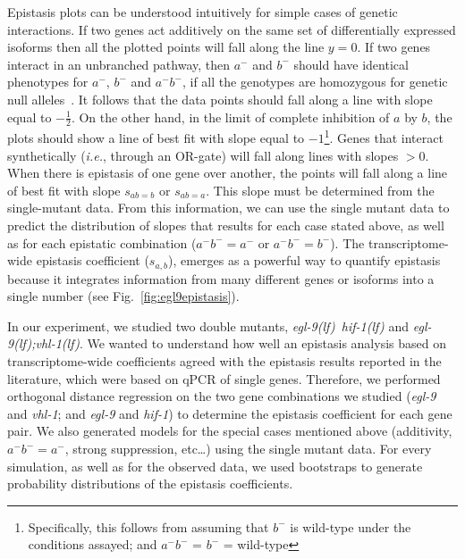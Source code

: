 \documentclass[9pt,twocolumn,twoside]{pnas-new}
\newcommand{\gene}[1]{\emph{#1}}
\newcommand{\eglvhl}{\emph{\mbox{egl-9(lf);vhl-1(lf)}}}
\newcommand{\eglhif}{\emph{\mbox{egl-9(lf)}~\mbox{hif-1(lf)}}}
\begin{document}
Epistasis plots can be understood intuitively for simple cases of genetic
interactions. If two genes act additively on the same set of differentially expressed
isoforms then all the plotted points will fall along the line $y=0$.
If two genes interact in an unbranched pathway, then $a^-$ and $b^-$ should
have identical phenotypes for $a^-$, $b^-$ and $a^-b^-$, if all the genotypes are
homozygous for genetic null alleles~\cite{Huang2006}. It follows that the
data points should fall along a line with slope equal to $-\frac{1}{2}$. On the
other hand, in the limit of complete inhibition of $a$ by $b$, the plots should show
a line of best fit with slope equal to $-1$\footnote{Specifically, this follows
from assuming that $b^-$ is wild-type under the conditions assayed; and
$a^-b^-$ = $b^-$ = wild-type}.
Genes that interact synthetically (\emph{i.e.}, through an OR-gate) will fall
along lines with slopes $>0$. When there is epistasis of one gene over another,
the points will fall along a line of best fit with slope $s_{ab=b}$ or $s_{ab=a}$.
This slope must be determined from the single-mutant data.
From this information, we can use the single mutant data to predict the
distribution of slopes that results for each case stated above, as well as for
each epistatic combination ($a^-b^-=a^-$ or $a^-b^-=b^-$). The transcriptome-wide
epistasis coefficient ($s_{a, b}$), emerges as a powerful way to quantify epistasis
because it integrates information from many different genes or isoforms into a
single number (see Fig.~\ref{fig:egl9epistasis}).

In our experiment, we studied two double mutants, \eglhif{} and \eglvhl{}.
We wanted to understand how well an epistasis analysis based on transcriptome-wide
coefficients agreed with the epistasis results reported in the literature, which
were based on qPCR of single genes. Therefore, we performed orthogonal distance
regression on the two gene combinations we studied (\gene{egl-9} and
\gene{vhl-1}; and \gene{egl-9} and \gene{hif-1}) to determine the epistasis
coefficient for each gene pair. We also generated models for the special cases
mentioned above (additivity, $a^-b^-=a^-$, strong suppression, etc\ldots) using
the single mutant data. For every simulation, as well as for the observed data,
we used bootstraps to generate probability distributions of the epistasis
coefficients.
\end{document}
